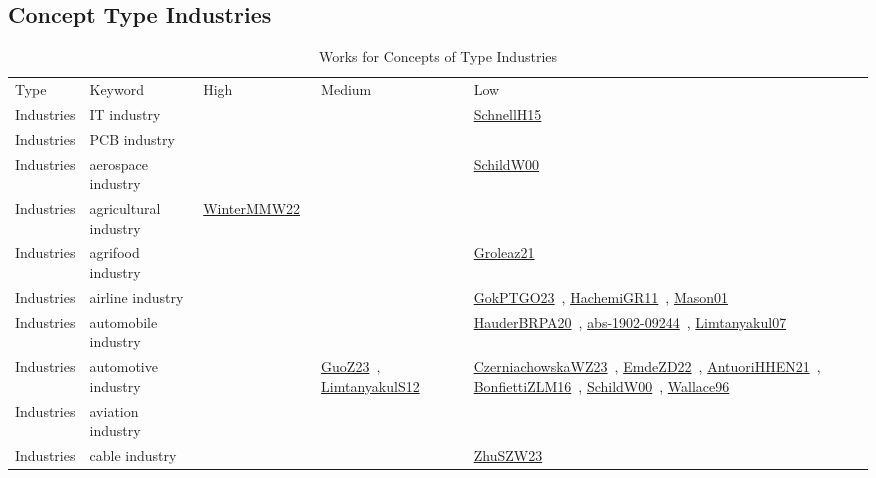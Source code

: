 \clearpage
\subsection{Concept Type Industries}
\label{sec:Industries}
{\scriptsize
\begin{longtable}{lp{3cm}>{\raggedright\arraybackslash}p{6cm}>{\raggedright\arraybackslash}p{6cm}>{\raggedright\arraybackslash}p{8cm}}
\rowcolor{white}\caption{Works for Concepts of Type Industries}\\ \toprule
\rowcolor{white}Type & Keyword & High & Medium & Low\\ \midrule\endhead
\bottomrule
\endfoot
Industries & IT industry &  &  & \href{../works/SchnellH15.pdf}{SchnellH15}~\cite{SchnellH15}\\
Industries & PCB industry &  &  & \\
Industries & aerospace industry &  &  & \href{../works/SchildW00.pdf}{SchildW00}~\cite{SchildW00}\\
Industries & agricultural industry & \href{../works/WinterMMW22.pdf}{WinterMMW22}~\cite{WinterMMW22} &  & \\
Industries & agrifood industry &  &  & \href{../works/Groleaz21.pdf}{Groleaz21}~\cite{Groleaz21}\\
Industries & airline industry &  &  & \href{../works/GokPTGO23.pdf}{GokPTGO23}~\cite{GokPTGO23}, \href{../works/HachemiGR11.pdf}{HachemiGR11}~\cite{HachemiGR11}, \href{../works/Mason01.pdf}{Mason01}~\cite{Mason01}\\
Industries & automobile industry &  &  & \href{../works/HauderBRPA20.pdf}{HauderBRPA20}~\cite{HauderBRPA20}, \href{../works/abs-1902-09244.pdf}{abs-1902-09244}~\cite{abs-1902-09244}, \href{../works/Limtanyakul07.pdf}{Limtanyakul07}~\cite{Limtanyakul07}\\
Industries & automotive industry &  & \href{../works/GuoZ23.pdf}{GuoZ23}~\cite{GuoZ23}, \href{../works/LimtanyakulS12.pdf}{LimtanyakulS12}~\cite{LimtanyakulS12} & \href{../works/CzerniachowskaWZ23.pdf}{CzerniachowskaWZ23}~\cite{CzerniachowskaWZ23}, \href{../works/EmdeZD22.pdf}{EmdeZD22}~\cite{EmdeZD22}, \href{../works/AntuoriHHEN21.pdf}{AntuoriHHEN21}~\cite{AntuoriHHEN21}, \href{../works/BonfiettiZLM16.pdf}{BonfiettiZLM16}~\cite{BonfiettiZLM16}, \href{../works/SchildW00.pdf}{SchildW00}~\cite{SchildW00}, \href{../works/Wallace96.pdf}{Wallace96}~\cite{Wallace96}\\
Industries & aviation industry &  &  & \\
Industries & cable industry &  &  & \href{../works/ZhuSZW23.pdf}{ZhuSZW23}~\cite{ZhuSZW23}\\

\end{longtable}}
